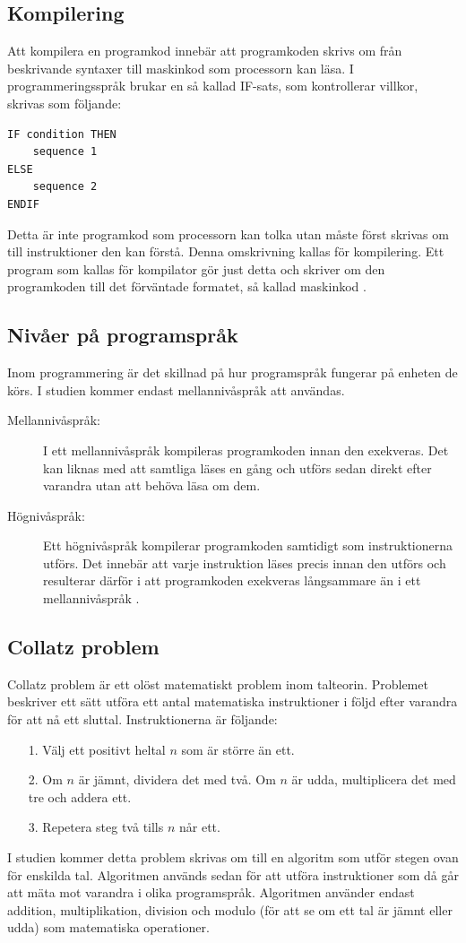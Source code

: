 \documentclass[12pt,swedish]{article}
\begin{document}
\subsection{Kompilering}
Att kompilera en programkod innebär att programkoden skrivs om från beskrivande syntaxer till maskinkod som processorn kan läsa. I programmeringsspråk brukar en så kallad IF-sats, som kontrollerar villkor, skrivas som följande:
\begin{lstlisting}
IF condition THEN
    sequence 1
ELSE
    sequence 2
ENDIF
\end{lstlisting}
Detta är inte programkod som processorn kan tolka utan måste först skrivas om till instruktioner den kan förstå. Denna omskrivning kallas för kompilering. Ett program som kallas för kompilator gör just detta och skriver om den programkoden till det förväntade formatet, så kallad maskinkod \citep{srikant_shankar_2008}.

\subsection{Nivåer på programspråk}
Inom programmering är det skillnad på hur programspråk fungerar på enheten de körs. I studien kommer endast mellannivåspråk att användas.
\begin{description}
    \item [Mellannivåspråk:] I ett mellannivåspråk kompileras programkoden innan den exekveras. Det kan liknas med att samtliga läses en gång och utförs sedan direkt efter varandra utan att behöva läsa om dem.
    \item [Högnivåspråk:] Ett högnivåspråk kompilerar programkoden samtidigt som instruktionerna utförs. Det innebär att varje instruktion läses precis innan den utförs och resulterar därför i att programkoden exekveras långsammare än i ett mellannivåspråk \citep{maclachlan_1992}.
\end{description}

\subsection{Collatz problem}
Collatz problem är ett olöst matematiskt problem inom talteorin. Problemet beskriver ett sätt utföra ett antal matematiska instruktioner i följd efter varandra för att nå ett sluttal. Instruktionerna är följande:
\begin{enumerate}
    \item [1.] Välj ett positivt heltal \( n \) som är större än ett.
    \item [2.] Om \( n \) är jämnt, dividera det med två. Om \( n \) är udda, multiplicera det med tre och addera ett.
    \item [3.] Repetera steg två tills \( n \) når ett.
\end{enumerate}
I studien kommer detta problem skrivas om till en algoritm som utför stegen ovan för enskilda tal. Algoritmen används sedan för att utföra instruktioner som då går att mäta mot varandra i olika programspråk. Algoritmen använder endast addition, multiplikation, division och modulo (för att se om ett tal är jämnt eller udda) som matematiska operationer.
\end{document}
